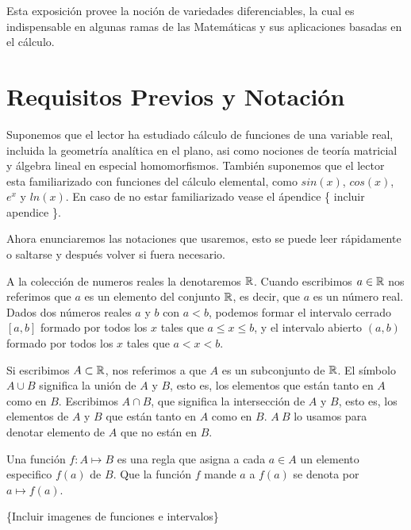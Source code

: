 Esta exposición provee la noción de variedades diferenciables, la cual es indispensable en algunas ramas de las Matemáticas y sus aplicaciones basadas en el cálculo.

\section{Requisitos Previos y Notación}

Suponemos que el lector ha estudiado cálculo de funciones de una variable real, incluida la geometría analítica en el plano, asi como nociones de teoría matricial y álgebra lineal en especial homomorfismos. También suponemos que el lector esta familiarizado con funciones del cálculo elemental, como $sin(x)$, $cos(x)$, $e^{x}$ y $ln(x)$. En caso de no estar familiarizado vease el ápendice \{ incluir apendice \}.

Ahora enunciaremos las notaciones que usaremos, esto se puede leer rápidamente o saltarse y después volver si fuera necesario.

A la colección de numeros reales la denotaremos $\mathbb{R}$. Cuando escribimos $a \in \mathbb{R}$ nos referimos que $a$ es un elemento del conjunto $\mathbb{R}$, es decir, que $a$ es un número real. Dados dos números reales $a$ y $b$ con $a < b$, podemos formar el intervalo cerrado $[a,b]$ formado por todos los $x$ tales que $a \le x \le b$, y el intervalo abierto $(a,b)$ formado por todos los $x$ tales que $a < x < b$.

Si escribimos $A \subset \mathbb{R}$, nos referimos a que $A$ es un subconjunto de $\mathbb{R}$. El símbolo $A \cup B$ significa la unión de $A$ y $B$, esto es, los elementos que están tanto en $A$ como en $B$. Escribimos $A \cap B$, que significa la intersección de $A$ y $B$, esto es, los elementos de $A$ y $B$ que están tanto en $A$ como en $B$. $A \ B$ lo usamos para denotar elemento de $A$ que no están en $B$.

Una función $f:A \mapsto B$ es una regla que asigna a cada $a \in A$ un elemento especifico $f(a)$ de $B$. Que la función $f$ mande $a$ a $f(a)$ se denota por $a \mapsto f(a)$.

\{Incluir imagenes de funciones e intervalos\} 




